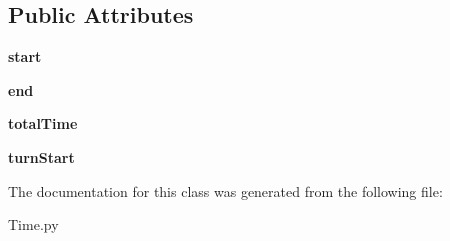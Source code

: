 \subsection*{Public Attributes}
\begin{DoxyCompactItemize}
\item 
\mbox{\label{class_time_1_1_time_a979714c0eb21ec0b20e5ba2e092b6579}} 
{\bfseries start}
\item 
\mbox{\label{class_time_1_1_time_a61b228c11c6bb3efef5ca1b432c841c0}} 
{\bfseries end}
\item 
\mbox{\label{class_time_1_1_time_afe5503bd50131699da71cb9ad56c530d}} 
{\bfseries total\+Time}
\item 
\mbox{\label{class_time_1_1_time_a2356f3a031befb638919910320e9ab8c}} 
{\bfseries turn\+Start}
\end{DoxyCompactItemize}


The documentation for this class was generated from the following file\+:\begin{DoxyCompactItemize}
\item 
Time.\+py\end{DoxyCompactItemize}
